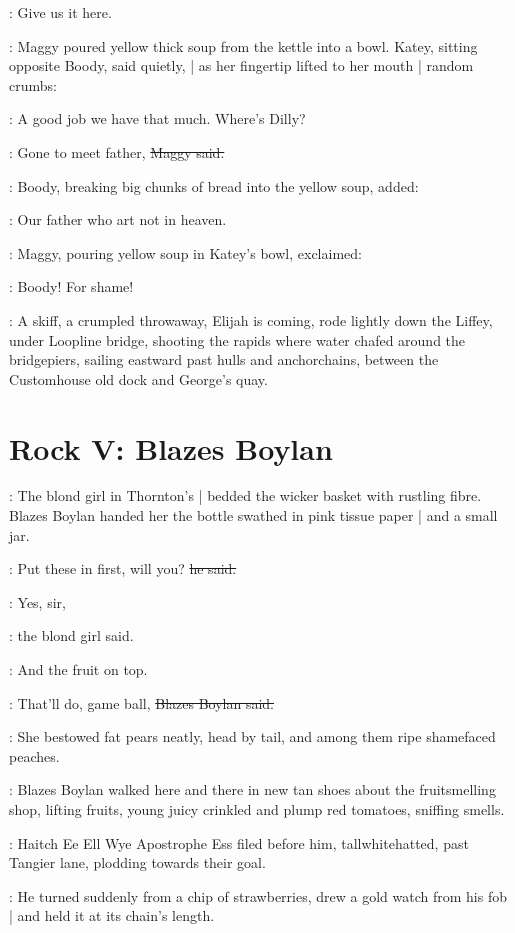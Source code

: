 \boody:
Give us it here.

:
Maggy poured yellow thick soup from the kettle into a bowl.
Katey,
sitting opposite Boody,
said quietly, |
as her fingertip lifted to her mouth |
random crumbs:

\katey:
A good job we have that much.
Where's Dilly?

\maggy:
Gone to meet father,
\sout{Maggy said.}

:
Boody,
breaking big chunks of bread into the yellow soup,
added:

\boody:
Our father who art not in heaven.

:
Maggy,
pouring yellow soup in Katey's bowl,
exclaimed:

\maggy:
Boody!
For shame!

:
A skiff,
a crumpled throwaway,
Elijah is coming,
rode lightly down the Liffey,
under Loopline bridge,
shooting the rapids where water chafed around the bridgepiers,
sailing eastward past hulls and anchorchains,
between the Customhouse old dock and George's quay.


\section*{Rock V: Blazes Boylan}

:
The blond girl in Thornton's |
bedded the wicker basket with rustling fibre.
Blazes Boylan handed her the bottle swathed in pink tissue paper |
and a small jar.

\boylan:
Put these in first, will you?
\sout{he said.}

\blondgirl:
Yes, sir,

:
the blond girl said.

\blondgirl:
And the fruit on top.

\boylan:
That'll do, game ball,
\sout{Blazes Boylan said.}

:
She bestowed fat pears neatly,
head by tail,
and among them ripe shamefaced peaches.

:
Blazes Boylan walked here and there in new tan shoes
about the fruitsmelling shop,
lifting fruits,
young juicy crinkled and plump red tomatoes,
sniffing smells.

:
Haitch Ee Ell Wye Apostrophe Ess \stage{[H.E.L.Y.'S]}
filed before him, tallwhitehatted,
past Tangier lane,
plodding towards their goal.

:
He turned suddenly from a chip of strawberries,
drew a gold watch from his fob |
and held it at its chain's length.

